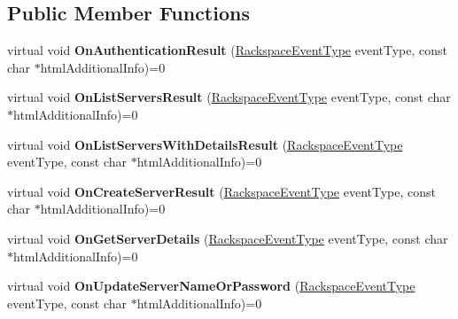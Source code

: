 \subsection*{Public Member Functions}
\begin{DoxyCompactItemize}
\item 
\hypertarget{class_rak_net_1_1_rackspace2_event_callback_a4d415eb0c7f05aa9c6dca2b5aae50aa7}{virtual void {\bfseries On\-Authentication\-Result} (\hyperlink{namespace_rak_net_a120cf6e1a0904cff45269f14c3c4c289}{Rackspace\-Event\-Type} event\-Type, const char $\ast$html\-Additional\-Info)=0}\label{class_rak_net_1_1_rackspace2_event_callback_a4d415eb0c7f05aa9c6dca2b5aae50aa7}

\item 
\hypertarget{class_rak_net_1_1_rackspace2_event_callback_a0752920db5a42e061e7133b0e7f88e23}{virtual void {\bfseries On\-List\-Servers\-Result} (\hyperlink{namespace_rak_net_a120cf6e1a0904cff45269f14c3c4c289}{Rackspace\-Event\-Type} event\-Type, const char $\ast$html\-Additional\-Info)=0}\label{class_rak_net_1_1_rackspace2_event_callback_a0752920db5a42e061e7133b0e7f88e23}

\item 
\hypertarget{class_rak_net_1_1_rackspace2_event_callback_a3fd9122fe68a1fb0ea630514080e7c01}{virtual void {\bfseries On\-List\-Servers\-With\-Details\-Result} (\hyperlink{namespace_rak_net_a120cf6e1a0904cff45269f14c3c4c289}{Rackspace\-Event\-Type} event\-Type, const char $\ast$html\-Additional\-Info)=0}\label{class_rak_net_1_1_rackspace2_event_callback_a3fd9122fe68a1fb0ea630514080e7c01}

\item 
\hypertarget{class_rak_net_1_1_rackspace2_event_callback_a1318ad765460fba04948079b3f251c8c}{virtual void {\bfseries On\-Create\-Server\-Result} (\hyperlink{namespace_rak_net_a120cf6e1a0904cff45269f14c3c4c289}{Rackspace\-Event\-Type} event\-Type, const char $\ast$html\-Additional\-Info)=0}\label{class_rak_net_1_1_rackspace2_event_callback_a1318ad765460fba04948079b3f251c8c}

\item 
\hypertarget{class_rak_net_1_1_rackspace2_event_callback_a74dff6d2f2528519abef749ab0c3fdf7}{virtual void {\bfseries On\-Get\-Server\-Details} (\hyperlink{namespace_rak_net_a120cf6e1a0904cff45269f14c3c4c289}{Rackspace\-Event\-Type} event\-Type, const char $\ast$html\-Additional\-Info)=0}\label{class_rak_net_1_1_rackspace2_event_callback_a74dff6d2f2528519abef749ab0c3fdf7}

\item 
\hypertarget{class_rak_net_1_1_rackspace2_event_callback_ad80a84fd745800b114aebfdf4f5cc20c}{virtual void {\bfseries On\-Update\-Server\-Name\-Or\-Password} (\hyperlink{namespace_rak_net_a120cf6e1a0904cff45269f14c3c4c289}{Rackspace\-Event\-Type} event\-Type, const char $\ast$html\-Additional\-Info)=0}\label{class_rak_net_1_1_rackspace2_event_callback_ad80a84fd745800b114aebfdf4f5cc20c}


\end{DoxyCompactItemize}
